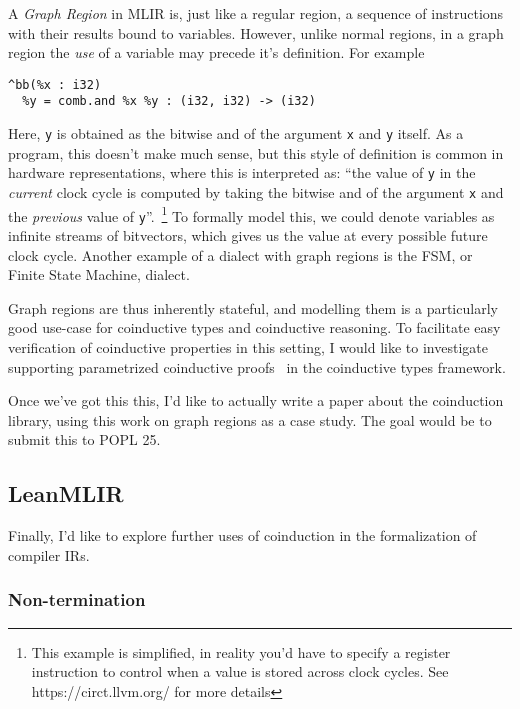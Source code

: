 \documentclass[a4paper]{scrartcl}
\begin{document}
A \emph{Graph Region} in MLIR is, just like a regular region, a sequence
of instructions with their results bound to variables. However, unlike
normal regions, in a graph region the \emph{use} of a variable may
precede it's definition. For example

\begin{verbatim}
^bb(%x : i32)
  %y = comb.and %x %y : (i32, i32) -> (i32)
\end{verbatim}

Here, \texttt{y} is obtained as the bitwise and of the argument
\texttt{x} and \texttt{y} itself. As a program, this doesn't make much
sense, but this style of definition is common in hardware
representations, where this is interpreted as: ``the value of \texttt{y}
in the \emph{current} clock cycle is computed by taking the bitwise and
of the argument \texttt{x} and the \emph{previous} value of \texttt{y}''.~\footnote{This example is simplified, in reality you'd have to specify a register instruction to control when a value is stored across clock cycles. See https://circt.llvm.org/ for more details} To formally model this, we could denote variables as infinite streams of bitvectors,
which gives us the value at every possible future clock cycle. Another
example of a dialect with graph regions is the FSM, or Finite State
Machine, dialect.

Graph regions are thus inherently stateful, and modelling them is a
particularly good use-case for coinductive types and coinductive
reasoning. To facilitate easy verification of coinductive properties in
this setting, I would like to investigate supporting parametrized
coinductive proofs~\cite{hurPowerParameterizationCoinductive} in
the coinductive types framework.

Once we've got this this, I'd like to actually write a paper about the coinduction library, using this work on graph regions as a case study.
The goal would be to submit this to POPL 25.


\subsection{LeanMLIR}\label{leanmlir}

Finally, I'd like to explore further uses of coinduction in the formalization of compiler IRs.

\subsubsection{Non-termination}\label{non-termination}
\end{document}
